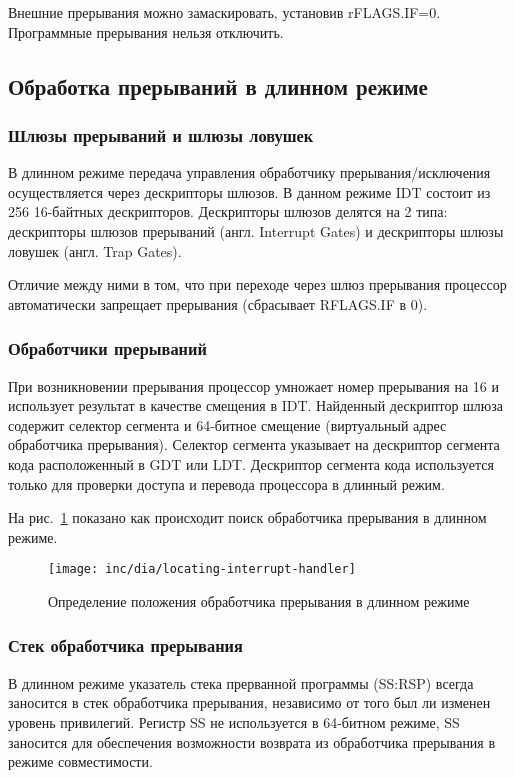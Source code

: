 Внешние прерывания можно замаскировать, установив rFLAGS.IF=0. Программные
прерывания нельзя отключить.

\subsection{Обработка прерываний в длинном режиме}
\subsubsection*{Шлюзы прерываний и шлюзы ловушек}
В длинном режиме передача управления обработчику прерывания/исключения
осуществляется через дескрипторы шлюзов. В данном режиме IDT состоит из 256
16-байтных дескрипторов. Дескрипторы шлюзов делятся на 2 типа: дескрипторы шлюзов
прерываний (англ. Interrupt Gates) и дескрипторы шлюзы ловушек (англ. Trap Gates).

Отличие между ними в том, что при переходе через шлюз прерывания процессор
автоматически запрещает прерывания (сбрасывает RFLAGS.IF в 0).

\subsubsection*{Обработчики прерываний}
При возникновении прерывания процессор умножает номер прерывания на 16 и
использует результат в качестве смещения в IDT. Найденный дескриптор шлюза
содержит селектор сегмента и 64-битное смещение (виртуальный адрес обработчика
прерывания). Селектор сегмента указывает на дескриптор сегмента кода
расположенный в GDT или LDT. Дескриптор сегмента кода используется только для
проверки доступа и перевода процессора в длинный режим.

На рис.~\ref{fig:locating_interrupt_handler} показано как происходит поиск
обработчика прерывания в длинном режиме.

\begin{figure}[ht!]
  \centering
  \texttt{[image: inc/dia/locating-interrupt-handler]}
  \caption{Определение положения обработчика прерывания в длинном режиме}
  \label{fig:locating_interrupt_handler}
\end{figure}


\subsubsection*{Стек обработчика прерывания}
В длинном режиме указатель стека прерванной программы (SS:RSP) всегда заносится в
стек обработчика прерывания, независимо от того был ли изменен уровень
привилегий. Регистр SS не используется в 64-битном режиме, SS заносится для
обеспечения возможности возврата из обработчика прерывания в режиме
совместимости.

